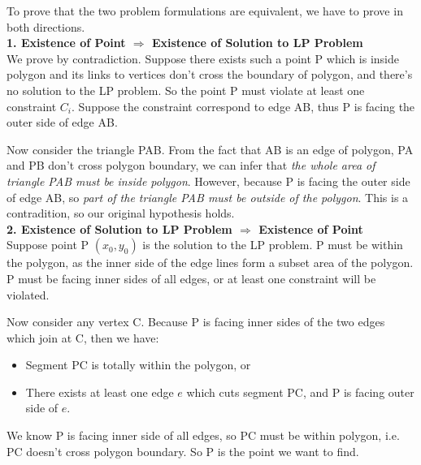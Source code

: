 To prove that the two problem formulations are equivalent, we have to prove in both directions.\\

\textbf{1. Existence of Point $\Rightarrow$ Existence of Solution to LP Problem }\\

We prove by contradiction. Suppose there exists such a point P which is inside polygon and its links to vertices don't cross the boundary of polygon, and there's no solution to the LP problem. So the point P must violate at least one constraint $C_i$. Suppose the constraint correspond to edge AB, thus P is facing the outer side of edge AB.

Now consider the triangle PAB. From the fact that AB is an edge of polygon, PA and PB don't cross polygon boundary, we can infer that \textit{the whole area of triangle PAB must be inside polygon}. However, because P is facing the outer side of edge AB, so \textit{part of the triangle PAB must be outside of the polygon}. This is a contradition, so our original hypothesis holds. \\

\textbf{2. Existence of Solution to LP Problem $\Rightarrow$ Existence of Point }\\

Suppose point P $(x_0, y_0)$ is the solution to the LP problem. P must be within the polygon, as the inner side of the edge lines form a subset area of the polygon. P must be facing inner sides of all edges, or at least one constraint will be violated.

Now consider any vertex C. Because P is facing inner sides of the two edges which join at C, then we have:

\begin{itemize}
\item Segment PC is totally within the polygon, or
\item There exists at least one edge $e$ which cuts segment PC, and P is facing outer side of $e$.
\end{itemize}

We know P is facing inner side of all edges, so PC must be within polygon, i.e. PC doesn't cross polygon boundary. So P is the point we want to find.
